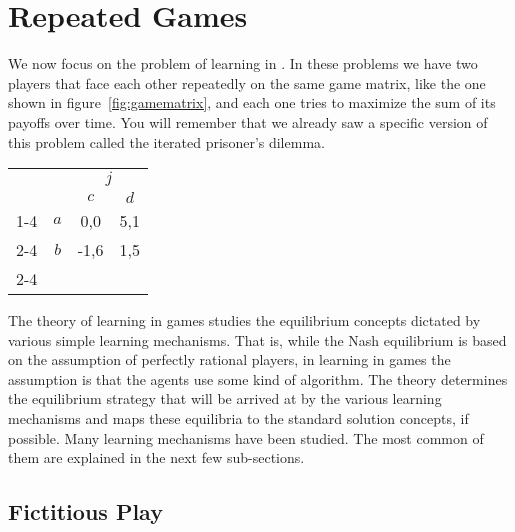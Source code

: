 \section{Repeated Games}
\label{sec:learning-repeated-games}

We now focus on the problem of learning in 
\cite{fudenberg98a}. In these problems we have two players that face
each other repeatedly on the same game matrix, like the one shown in
figure~\ref{fig:gamematrix}, and each one tries to maximize the sum of
its payoffs over time. You will remember that we already saw a
specific version of this problem called the iterated prisoner's
dilemma.

\begin{SCfigure}
  \begin{minipage}{1.0\linewidth}
  \begin{center}
    \renewcommand\arraystretch{1.5}
    \begin{tabular}{cc|c|c|}
      &    &\multicolumn{2}{c}{$j$} \\  & &$c$&$d$ \\ \cline{1-4}
      \multirow{2}{2em}{$i$}
      & $a$  &0,0 & 5,1 \\ \cline{2-4}
      & $b$  &-1,6 & 1,5 \\ \cline{2-4}
    \end{tabular}
  \end{center}
  \end{minipage}
  \caption{Sample two-player game matrix. Agent $i$ chooses from the
    rows and agent $j$ chooses from the columns.} 
  \label{fig:gamematrix}
\end{SCfigure}


The theory of learning in games studies the equilibrium concepts
dictated by various simple learning mechanisms. That is, while the
Nash equilibrium is based on the assumption of perfectly rational
players, in learning in games the assumption is that the agents use
some kind of algorithm. The theory determines the equilibrium strategy
that will be arrived at by the various learning mechanisms and maps
these equilibria to the standard solution concepts, if
possible. Many learning mechanisms have been studied. The most common
of them are explained in the next few sub-sections.

\subsection{Fictitious Play}
\label{sec:fictitious-play}


